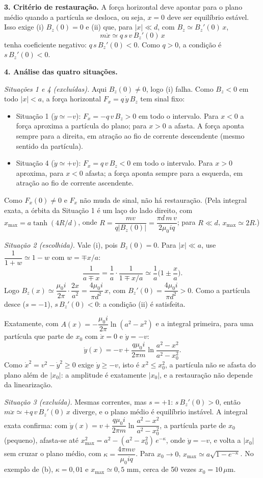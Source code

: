 \documentclass{article}%
\begin{document}
\textbf{3. Critério de restauração.} A força horizontal deve apontar para o plano médio quando a partícula se desloca, ou seja, $x=0$ deve ser equilíbrio estável. Isso exige (i) $B_z(0)=0$ e (ii) que, para $|x|\ll d$, com $B_z\simeq B_z'(0)\,x$,
\[
m\ddot x\simeq q\,s\,v\,B_z'(0)\,x
\]
tenha coeficiente negativo: $q\,s\,B_z'(0)<0$. Como $q>0$, a condição é $s\,B_z'(0)<0$.

\textbf{4. Análise das quatro situações.}

\emph{Situações 1 e 4 (excluídas).} Aqui $B_z(0)\neq 0$, logo (i) falha. Como $B_z<0$ em todo $|x|<a$, a força horizontal $F_x=q\,\dot y\,B_z$ tem sinal fixo:
\begin{itemize}
\item Situação 1 ($\dot y\simeq -v$): $F_x=-q\,v\,B_z>0$ em todo o intervalo. Para $x<0$ a força aproxima a partícula do plano; para $x>0$ a afasta. A força aponta sempre para a direita, em atração ao fio de corrente descendente (mesmo sentido da partícula).
\item Situação 4 ($\dot y\simeq +v$): $F_x=q\,v\,B_z<0$ em todo o intervalo. Para $x>0$ aproxima, para $x<0$ afasta; a força aponta sempre para a esquerda, em atração ao fio de corrente ascendente.
\end{itemize}
Como $F_x(0)\neq 0$ e $F_x$ não muda de sinal, não há restauração. (Pela integral exata, a órbita da Situação 1 é um laço do lado direito, com $x_{\max}=a\tanh(4R/d)$, onde $R=\dfrac{mv}{q|B_z(0)|}=\dfrac{\pi d\,m\,v}{2\mu_0 i q}$; para $R\ll d$, $x_{\max}\simeq 2R$.)

\emph{Situação 2 (escolhida).} Vale (i), pois $B_z(0)=0$. Para $|x|\ll a$, use $\dfrac{1}{1+w}\simeq 1-w$ com $w=\mp x/a$:
\[
\frac{1}{a\mp x}=\frac{1}{a}\cdot\frac{1}{1\mp x/a}\simeq\frac{1}{a}\Big(1\pm\frac{x}{a}\Big).
\]
Logo $B_z(x)\simeq\dfrac{\mu_0 i}{2\pi}\cdot\dfrac{2x}{a^2}=\dfrac{4\mu_0 i}{\pi d^2}\,x$, com $B_z'(0)=\dfrac{4\mu_0 i}{\pi d^2}>0$. Como a partícula desce ($s=-1$), $s\,B_z'(0)<0$: a condição (ii) é satisfeita.

Exatamente, com $A(x)=-\dfrac{\mu_0 i}{2\pi}\ln(a^2-x^2)$ e a integral primeira, para uma partícula que parte de $x_0$ com $\dot x=0$ e $\dot y=-v$:
\[
\dot y(x)=-v+\frac{q\mu_0 i}{2\pi m}\ln\frac{a^2-x^2}{a^2-x_0^2}.
\]
Como $\dot x^2=v^2-\dot y^2\ge 0$ exige $\dot y\ge -v$, isto é $x^2\le x_0^2$, a partícula não se afasta do plano além de $|x_0|$: a amplitude é exatamente $|x_0|$, e a restauração não depende da linearização.

\emph{Situação 3 (excluída).} Mesmas correntes, mas $s=+1$: $s\,B_z'(0)>0$, então $m\ddot x\simeq +q\,v\,B_z'(0)\,x$ diverge, e o plano médio é equilíbrio instável. A integral exata confirma: com $\dot y(x)=v+\dfrac{q\mu_0 i}{2\pi m}\ln\dfrac{a^2-x^2}{a^2-x_0^2}$, a partícula parte de $x_0$ (pequeno), afasta-se até $x_{\max}^2=a^2-(a^2-x_0^2)\,e^{-\kappa}$, onde $\dot y=-v$, e volta a $|x_0|$ sem cruzar o plano médio, com $\kappa=\dfrac{4\pi m v}{\mu_0 i q}$. Para $x_0\to 0$, $x_{\max}\simeq a\sqrt{1-e^{-\kappa}}$. No exemplo de (b), $\kappa=0{,}01$ e $x_{\max}\simeq 0{,}5$ mm, cerca de 50 vezes $x_0=10\,\mu$m.
\end{document}
